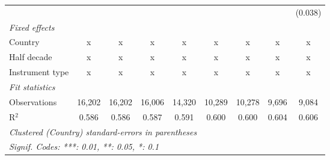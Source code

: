 \begin{tabular}{lcccccccc}
                                                                           &                &                &                &               &                &                &                & (0.038)\\   
   \emph{Fixed effects}\\
   Country                                                                 & x              & x              & x              & x             & x              & x              & x              & x\\  
   Half decade                                                             & x              & x              & x              & x             & x              & x              & x              & x\\  
   Instrument type                                                         & x              & x              & x              & x             & x              & x              & x              & x\\  
   \midrule \emph{Fit statistics}\\
   Observations                                                            & 16,202         & 16,202         & 16,006         & 14,320        & 10,289         & 10,278         & 9,696          & 9,084\\  
   R$^2$                                                                   & 0.586          & 0.586          & 0.587          & 0.591         & 0.600          & 0.600          & 0.604          & 0.606\\  
   \midrule
   \multicolumn{9}{l}{\emph{Clustered (Country) standard-errors in parentheses}}\\
   \multicolumn{9}{l}{\emph{Signif. Codes: ***: 0.01, **: 0.05, *: 0.1}}\\
\end{tabular}
\par\endgroup


